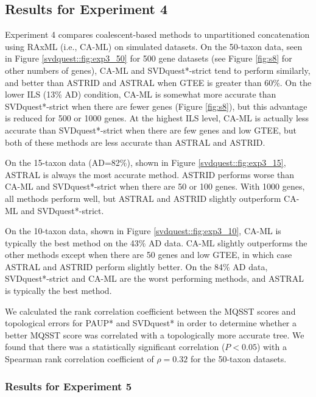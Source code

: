 \clearpage

\subsection{Results for Experiment 4}

Experiment 4 compares coalescent-based methods to unpartitioned
concatenation using RAxML (i.e., CA-ML) on simulated datasets.  On the 50-taxon data, seen in
Figure \ref{svdquest::fig:exp3_50} for 500 gene datasets
{(see Figure \ref{fig:s8} for other numbers of genes)},
CA-ML and SVDquest*-strict tend to perform similarly, and better than ASTRID
and ASTRAL when GTEE is greater than 60\%.  
On the lower ILS (13\% AD)
condition, CA-ML is somewhat more accurate than SVDquest*-strict when there
are fewer genes  {(Figure \ref{fig:s8})}, but this advantage is
reduced for 500 or 1000 genes. At the highest ILS level, CA-ML is
actually less accurate than SVDquest*-strict when there are few genes and low
GTEE, but both of these methods are less accurate than ASTRAL and
ASTRID.

On the 15-taxon data (AD=82\%), shown in Figure \ref{svdquest::fig:exp3_15}, 
ASTRAL is always the
most accurate method. ASTRID performs worse than CA-ML and
SVDquest*-strict when there are 50 or 100 genes. With 1000 genes, all methods
perform well, but ASTRAL and ASTRID slightly outperform CA-ML and
SVDquest*-strict. 

On the 10-taxon data, shown in Figure \ref{svdquest::fig:exp3_10}, CA-ML is
typically the best method on the 43\% AD  data. 
CA-ML slightly
outperforms the other methods except when there are 50 genes and low
GTEE, in which case ASTRAL and ASTRID perform slightly better. On the
84\% AD  data, SVDquest*-strict and CA-ML are the worst performing
methods, and ASTRAL is typically the best method.

We calculated the rank correlation coefficient between
the MQSST scores and topological errors for PAUP* and SVDquest* in
order to determine whether a better MQSST score was correlated with a topologically
more accurate tree. 
We found that there was a statistically
significant correlation ($P < 0.05$) with a Spearman rank correlation coefficient of $\rho = 0.32$ for the 50-taxon datasets.


\subsubsection{Results for Experiment 5}



